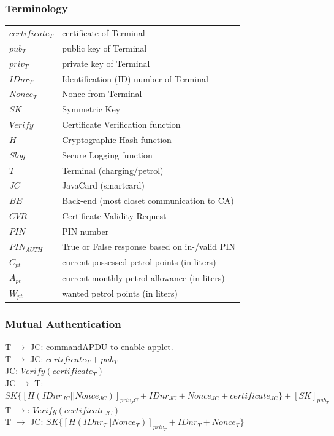 \subsubsection{Terminology}
	\begin{tabular}{*{2}{l}}
	 $certificate_{T}$ & certificate of Terminal \\
	 $pub_{T}$ & public key of Terminal \\
 	 $priv_{T}$ & private key of Terminal  \\
	 $IDnr_{T}$ & Identification (ID) number of Terminal \\
	 $Nonce_{T}$ & Nonce from Terminal \\
	 $SK$ & Symmetric Key \\
	 $Verify$ & Certificate Verification function \\
	 $H$ & Cryptographic Hash function \\
	 $Slog$ & Secure Logging function \\
	 $T$ & Terminal (charging/petrol) \\
	 $JC$ & JavaCard (smartcard) \\
	 $BE$ & Back-end (most closet communication to CA)\\
	 $CVR$ & Certificate Validity Request \\
	 $PIN$ & PIN number \\
	 $PIN_{AUTH}$ & True or False response based on in-/valid PIN \\
	 $C_{pt}$ & current possessed petrol points (in liters) \\
	 $A_{pt}$ & current monthly petrol allowance (in liters) \\
	 $W_{pt}$ & wanted petrol points (in liters) \\
	\end{tabular}
	
\subsubsection{Mutual Authentication}
T $\to$ JC: commandAPDU to enable applet.\\
T $\to$ JC: $certificate_{T}+pub_{T}$\\
JC: $Verify(certificate_{T})$\\
JC $\to$ T: $SK\{[H(IDnr_{JC}||Nonce_{JC})]_{priv_JC}+IDnr_{JC}+Nonce_{JC}+certificate_{JC}\}+[SK]_{pub_T}$\\
T $\to$: $Verify(certificate_{JC})$\\
T $\to$ JC: $SK\{[H(IDnr_{T}||Nonce_{T})]_{priv_T}+IDnr_{T}+Nonce_{T}\}$


